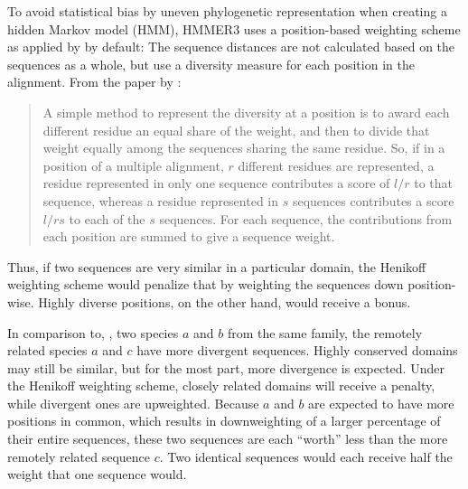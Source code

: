\label{sec:hmmtest}
To avoid statistical bias by uneven phylogenetic representation when creating a
hidden Markov model (HMM), HMMER3 \citep{eddy2009} uses a position-based
weighting scheme as applied by \citet{henikoff1994} by default: The sequence
distances are not calculated based on the sequences as a whole, but use a
diversity measure for each position in the alignment. From the paper by
\citet{henikoff1994}:

\begin{quote}
	A simple method to represent the diversity at a position is to award each
	different residue an equal share of the weight, and then to divide that
	weight equally among the sequences sharing the same residue. So, if in a
	position of a multiple alignment, $r$ different residues are represented, a
	residue represented in only one sequence contributes a score of $l/r$ to that
	sequence, whereas a residue represented in $s$ sequences contributes a score
	$l/rs$ to each of the $s$ sequences. For each sequence, the contributions
	from each position are summed to give a sequence weight.
\end{quote}

Thus, if two sequences are very similar in a particular domain, the Henikoff
weighting scheme would penalize that by weighting the sequences down
position-wise. Highly diverse positions, on the other hand, would receive a
bonus. 

In comparison to, \eg, two species $a$ and $b$ from the same family, the
remotely related species $a$ and $c$ have more divergent sequences. Highly
conserved domains may still be similar, but for the most part, more divergence
is expected. Under the Henikoff weighting scheme, closely related domains will
receive a penalty, while divergent ones are upweighted. Because $a$ and $b$ are
expected to have more positions in common, which results in downweighting of a
larger percentage of their entire sequences, these two sequences are each
``worth'' less than the more remotely related sequence $c$. Two identical
sequences would each receive half the weight that one sequence would.
